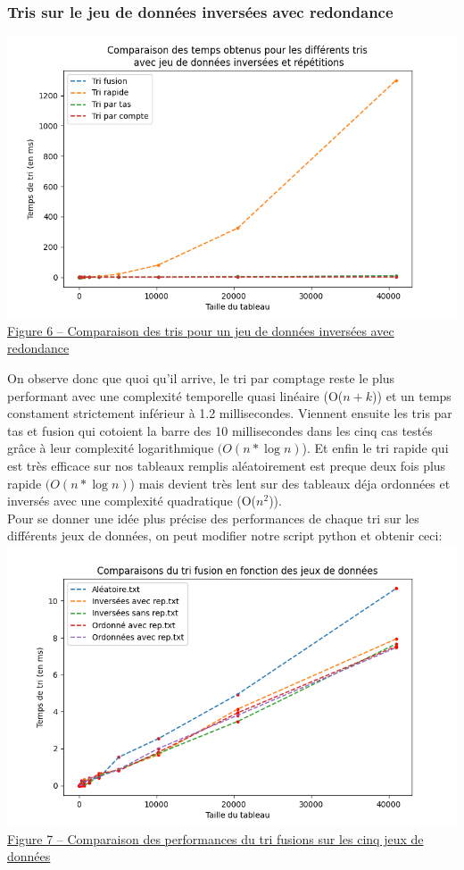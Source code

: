 \documentclass[11pt,a4paper]{article}
\begin{document}
\subsubsection{Tris sur le jeu de données inversées avec redondance}
\includegraphics[scale = 0.5]{Images/Courbes img/inversé avec rep/inversées avec répétitions.png}\\
\underline {Figure 6 – Comparaison des tris pour un jeu de données inversées avec redondance}

\vspace{1cm}

On observe donc que quoi qu'il arrive, le tri par comptage reste le plus performant avec une complexité temporelle
quasi linéaire (O($n+k$)) et un temps constament strictement inférieur à 1.2 millisecondes. Viennent ensuite les tris par tas et fusion
qui cotoient la barre des 10 millisecondes dans les cinq cas testés grâce à leur complexité logarithmique $\displaystyle{(O(n * \log{n})}$). Et enfin le tri rapide qui est très efficace sur nos tableaux
remplis aléatoirement est preque deux fois plus rapide $\displaystyle{(O(n * \log{n})}$) mais devient très lent sur des tableaux déja ordonnées et inversés avec une complexité quadratique (O($n^2$)).\\
Pour se donner une idée plus précise des performances de chaque tri sur les différents jeux de données, on peut modifier notre script python et obtenir ceci:\\

\includegraphics[scale = 0.5]{Images/Courbes img/individuels/tri fusion.png}\\
\underline {Figure 7 – Comparaison des performances du tri fusions sur les cinq jeux de données}
\end{document}
